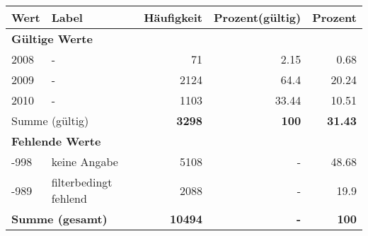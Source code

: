      \begin{longtable}{lXrrr}
     \toprule
     \textbf{Wert} & \textbf{Label} & \textbf{Häufigkeit} & \textbf{Prozent(gültig)} & \textbf{Prozent} \\
     \endhead
     \midrule
     \multicolumn{5}{l}{\textbf{Gültige Werte}}\\

     2008 &
     \multicolumn{1}{X}{ -  } &


       \num{71} &
       \num[round-mode=places,round-precision=2]{2,15} &
         \num[round-mode=places,round-precision=2]{0,68} \\

     2009 &
     \multicolumn{1}{X}{ -  } &


       \num{2124} &
       \num[round-mode=places,round-precision=2]{64,4} &
         \num[round-mode=places,round-precision=2]{20,24} \\

     2010 &
     \multicolumn{1}{X}{ -  } &


       \num{1103} &
       \num[round-mode=places,round-precision=2]{33,44} &
         \num[round-mode=places,round-precision=2]{10,51} \\
     \midrule
     \multicolumn{2}{l}{Summe (gültig)} &
       \textbf{\num{3298}} &
     \textbf{100} &
       \textbf{\num[round-mode=places,round-precision=2]{31,43}} \\
     \multicolumn{5}{l}{\textbf{Fehlende Werte}}\\
       -998 &
       keine Angabe &
         \num{5108} &
        - &
         \num[round-mode=places,round-precision=2]{48,68} \\
       -989 &
       filterbedingt fehlend &
         \num{2088} &
        - &
         \num[round-mode=places,round-precision=2]{19,9} \\
     \midrule
     \multicolumn{2}{l}{\textbf{Summe (gesamt)}} &
          \textbf{\num{10494}} &
        \textbf{-} &
        \textbf{100} \\
     \bottomrule
     \end{longtable}
     
